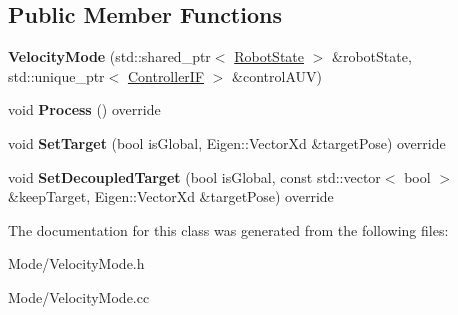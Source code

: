 \subsection*{Public Member Functions}
\begin{DoxyCompactItemize}
\item 
\mbox{\label{classproc__control_1_1_velocity_mode_ae9b524024246a8ff8404f6673f1e48e5}} 
{\bfseries Velocity\+Mode} (std\+::shared\+\_\+ptr$<$ \hyperlink{classproc__control_1_1_robot_state}{Robot\+State} $>$ \&robot\+State, std\+::unique\+\_\+ptr$<$ \hyperlink{classproc__control_1_1_controller_i_f}{Controller\+IF} $>$ \&control\+A\+UV)
\item 
\mbox{\label{classproc__control_1_1_velocity_mode_aae19dc6c1816b938b4ee3fed99bc59fb}} 
void {\bfseries Process} () override
\item 
\mbox{\label{classproc__control_1_1_velocity_mode_a69f4661842a0619df669b73c1c36cbff}} 
void {\bfseries Set\+Target} (bool is\+Global, Eigen\+::\+Vector\+Xd \&target\+Pose) override
\item 
\mbox{\label{classproc__control_1_1_velocity_mode_aaaa1e4cb5e6ffe0b07db4626068e0b3a}} 
void {\bfseries Set\+Decoupled\+Target} (bool is\+Global, const std\+::vector$<$ bool $>$ \&keep\+Target, Eigen\+::\+Vector\+Xd \&target\+Pose) override
\end{DoxyCompactItemize}


The documentation for this class was generated from the following files\+:\begin{DoxyCompactItemize}
\item 
Mode/Velocity\+Mode.\+h\item 
Mode/Velocity\+Mode.\+cc\end{DoxyCompactItemize}
